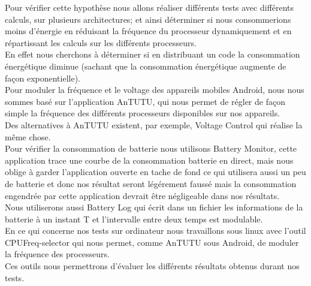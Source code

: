 	Pour vérifier cette hypothèse nous allons réaliser différents tests avec différents calculs, sur plusieurs architectures; et ainsi déterminer si nous consommerions moins d'énergie en réduisant la fréquence du processeur dynamiquement et en répartissant les calculs sur les différents processeurs.\\

	En effet nous cherchons à déterminer si en distribuant un code la consommation énergétique diminue (sachant que la consommation énergétique augmente de façon exponentielle).\\

	Pour moduler la fréquence et le voltage des appareils mobiles Android, nous nous sommes basé sur l'application AnTUTU, qui nous permet de régler de façon simple la fréquence des différents processeurs disponibles sur nos appareils.\\

	Des alternatives à AnTUTU existent, par exemple, Voltage Control qui réalise la même chose. \\

	Pour vérifier la consommation de batterie nous utilisons Battery Monitor, cette application trace une courbe de la consommation batterie en direct, mais nous oblige à garder l'application ouverte en tache de fond ce qui utilisera aussi un peu de batterie et donc nos résultat seront légérement faussé mais la consommation engendrée par cette application devrait être négligeable dans nos résultats. \\

	Nous utiliserons aussi Battery Log qui écrit dans un fichier les informations de la batterie à un instant T et l'intervalle entre deux temps est modulable.\\

	En ce qui concerne nos tests sur ordinateur nous travaillons sous linux avec l'outil CPUFreq-selector qui nous permet, comme AnTUTU sous Android, de moduler la fréquence des processeurs.\\

	Ces outils nous permettrons d'évaluer les différents résultats obtenus durant nos tests.
